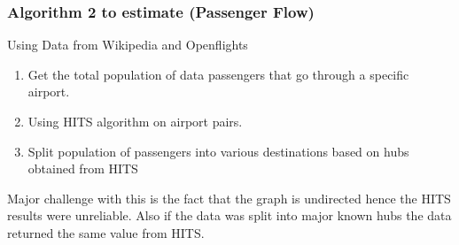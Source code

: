 \documentclass{beamer}
\begin{document}
\begin{frame}
\begin{frame}
\frametitle{Algorithm 2 to estimate (Passenger Flow)}
Using Data from Wikipedia and Openflights
\begin{enumerate}
	\item Get the total population of data passengers that go through a specific airport.
	\item Using HITS algorithm on airport pairs.
	\item Split population of passengers into various destinations based on hubs obtained from HITS
\end{enumerate}
Major challenge with this is the fact that the graph is undirected hence the HITS results were unreliable. Also if the data was split into major known hubs the data returned the same value from HITS.
\end{frame}

\begin{frame}


\end{frame}
\end{frame}
\end{document}
